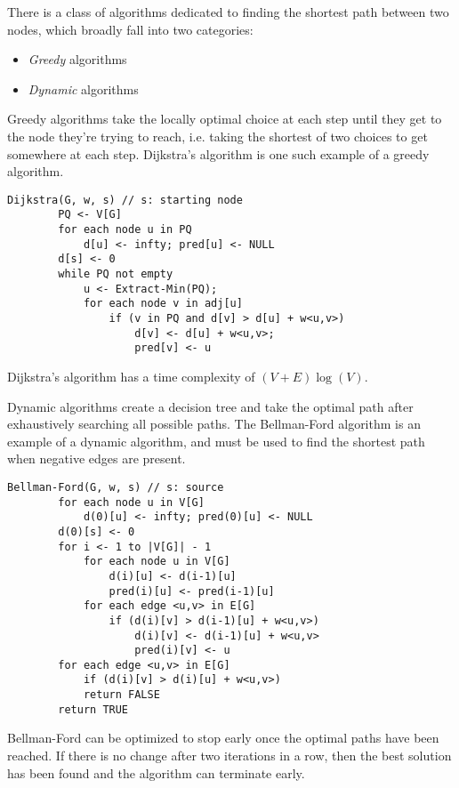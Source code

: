 There is a class of algorithms dedicated to finding the shortest
path between two nodes, which broadly fall into two categories:
\begin{itemize}
    \item \emph{Greedy} algorithms
    \item \emph{Dynamic} algorithms
\end{itemize}
Greedy algorithms take the locally optimal choice at each step until they get to the
node they're trying to reach, i.e. taking the shortest of two choices to get somewhere
at each step. Dijkstra's algorithm is one such example of a greedy algorithm.
\begin{lstlisting}[caption={Dijkstra's algorithm}]
    Dijkstra(G, w, s) // s: starting node
        PQ <- V[G]
        for each node u in PQ
            d[u] <- infty; pred[u] <- NULL
        d[s] <- 0
        while PQ not empty
            u <- Extract-Min(PQ);
            for each node v in adj[u]
                if (v in PQ and d[v] > d[u] + w<u,v>)
                    d[v] <- d[u] + w<u,v>;
                    pred[v] <- u
\end{lstlisting}
Dijkstra's algorithm has a time complexity of $(V + E)\log(V)$.

Dynamic algorithms create a decision tree and take the optimal path after exhaustively
searching all possible paths. The Bellman-Ford algorithm is an example of a dynamic
algorithm, and must be used to find the shortest path when negative edges are present.
\begin{lstlisting}[caption={Bellman-Ford algorithm}]
    Bellman-Ford(G, w, s) // s: source
        for each node u in V[G]
            d(0)[u] <- infty; pred(0)[u] <- NULL
        d(0)[s] <- 0
        for i <- 1 to |V[G]| - 1
            for each node u in V[G]
                d(i)[u] <- d(i-1)[u]
                pred(i)[u] <- pred(i-1)[u]
            for each edge <u,v> in E[G]
                if (d(i)[v] > d(i-1)[u] + w<u,v>)
                    d(i)[v] <- d(i-1)[u] + w<u,v>
                    pred(i)[v] <- u
        for each edge <u,v> in E[G]
            if (d(i)[v] > d(i)[u] + w<u,v>)
            return FALSE
        return TRUE
\end{lstlisting}
Bellman-Ford can be optimized to stop early once the optimal paths have
been reached. If there is no change after two iterations in a row, then
the best solution has been found and the algorithm can terminate early.

